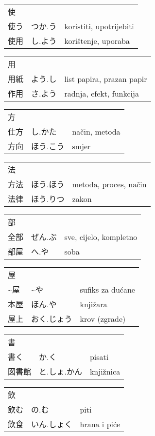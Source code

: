 

\newenvironment{dictentry}[1]{
	\begin{tabular}{p{2cm} p{3cm} p{10cm}}
		#1 &&\\
}{
	\end{tabular}
	\vspace{20pt}
}

\newcommand{\example}[3]{
	\hspace*{\fill}#1 & #2 & #3\\
}

\author{ロボット君}


\begin{dictentry}{使}
\example{使う}{つか.う}{koristiti, upotrijebiti}
\example{使用}{し.よう}{korištenje, uporaba}
\end{dictentry}

\begin{dictentry}{用}
\example{用紙}{よう.し}{list papira, prazan papir}
\example{作用}{さ.よう}{radnja, efekt, funkcija}
\end{dictentry}

\begin{dictentry}{方}
\example{仕方}{し.かた}{način, metoda}
\example{方向}{ほう.こう}{smjer}
\end{dictentry}

\begin{dictentry}{法}
\example{方法}{ほう.ほう}{metoda, proces, način}
\example{法律}{ほう.りつ}{zakon}
\end{dictentry}

\begin{dictentry}{部}
\example{全部}{ぜん.ぶ}{sve, cijelo, kompletno}
\example{部屋}{へ.や\footnotemark[1]}{soba}
\end{dictentry}

\begin{dictentry}{屋}
\example{\textasciitilde 屋}{\textasciitilde や}{sufiks za dućane}
\example{本屋}{ほん.や}{knjižara}
\example{屋上}{おく.じょう}{krov (zgrade)}
\end{dictentry}

\begin{dictentry}{書}
\example{書く}{か.く}{pisati}
\example{図書館}{と.しょ.かん}{knjižnica}
\end{dictentry}

\begin{dictentry}{飲}
\example{飲む}{の.む}{piti}
\example{飲食}{いん.しょく}{hrana i piće}
\end{dictentry}


